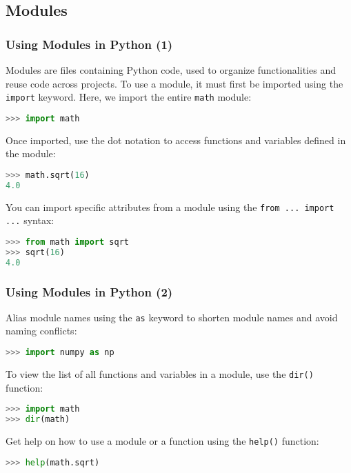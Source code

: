 \subsection*{Modules}
\begin{frame}[fragile]
  \frametitle{Using Modules in Python (1)}
  Modules are files containing Python code, used to organize functionalities and reuse code across projects. To use a module, it must first be imported using the \lstinline{import} keyword. Here, we import the entire \lstinline{math} module:
  \begin{lstlisting}[language=Python, numbers=none]
>>> import math
  \end{lstlisting}\pause
  Once imported, use the dot notation to access functions and variables defined in the module:
  \begin{lstlisting}[language=Python, numbers=none]
>>> math.sqrt(16)
4.0
  \end{lstlisting}\pause
  You can import specific attributes from a module using the \lstinline{from ... import ...} syntax:
  \begin{lstlisting}[language=Python, numbers=none]
>>> from math import sqrt
>>> sqrt(16)
4.0
  \end{lstlisting}
\end{frame}

\begin{frame}[fragile]
  \frametitle{Using Modules in Python (2)}
  Alias module names using the \lstinline{as} keyword to shorten module names and avoid naming conflicts:
  \begin{lstlisting}[language=Python, numbers=none]
>>> import numpy as np
  \end{lstlisting}\pause
  To view the list of all functions and variables in a module, use the \lstinline{dir()} function:
  \begin{lstlisting}[language=Python, numbers=none]
>>> import math
>>> dir(math)
  \end{lstlisting}\pause
  Get help on how to use a module or a function using the \lstinline{help()} function:
  \begin{lstlisting}[language=Python, numbers=none]
>>> help(math.sqrt)
  \end{lstlisting}
\end{frame}


